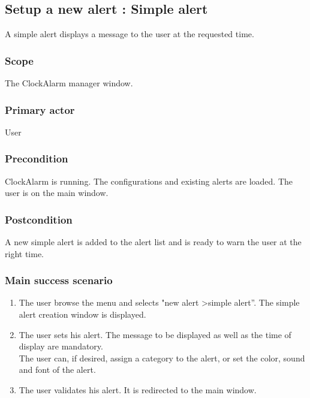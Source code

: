 \subsection{Setup a new alert : Simple alert}
A simple alert displays a message to the user at the requested time.
\subsubsection{Scope}
The ClockAlarm manager window.
\subsubsection{Primary actor}
User
\subsubsection{Precondition}
ClockAlarm is running. The configurations and existing alerts are loaded. The user is on the main window.
\subsubsection{Postcondition}
A new simple alert is added to the alert list and is ready to warn the user at the right time.
\subsubsection{Main success scenario}
\begin{enumerate}
	\item The user browse the menu and selects "new alert \textgreater simple alert''. The simple alert creation window is displayed. 
	\item \label{itm:enter} The user sets his alert. The message to be displayed as well as the time of display are mandatory. \\The user can, if desired, assign a category to the alert, or set the color, sound and font of the alert.
	\item \label{itm:validate} The user validates his alert. It is redirected to the main window.
\end{enumerate}
